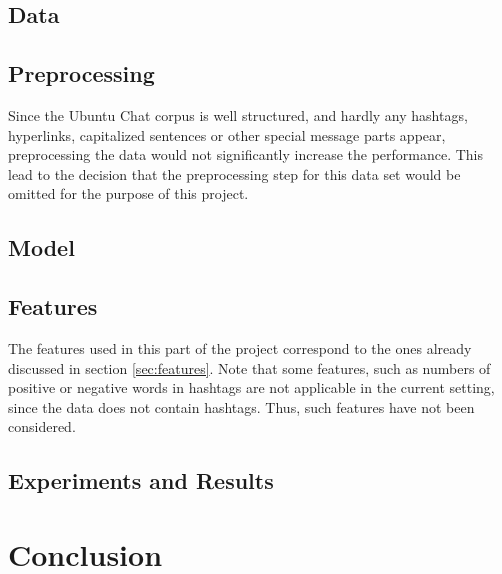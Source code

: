 \documentclass{article} %
\begin{document}
\subsection{Data}\label{sec:ubuntudata}



\subsection{Preprocessing}

Since the Ubuntu Chat corpus is well structured, and hardly any hashtags, hyperlinks, capitalized sentences or other special message parts appear, preprocessing the data would not significantly increase the performance. This lead to the decision that the preprocessing step for this data set would be omitted for the purpose of this project.


\subsection{Model}



\subsection{Features}

\noindent The features used in this part of the project correspond to the ones already discussed in section \ref{sec:features}. Note that some features, such as numbers of positive or negative words in hashtags are not applicable in the current setting, since the data does not contain hashtags. Thus, such features have not been considered. 


\subsection{Experiments and Results}



\section{Conclusion}

\end{document}
